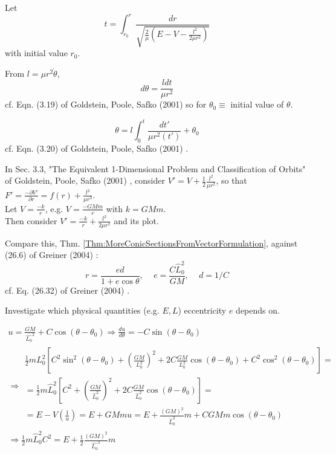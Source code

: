 \documentclass[10pt]{amsart}
\begin{document}
\begin{multicols*}{2}
Let
\[
t =\int_{r_0}^r \frac{dr}{ \sqrt{ \frac{2}{\mu} \left( E - V - \frac{l^2}{2 \mu r^2 } \right) } }
\]
with initial value $r_0$.

From $l= \mu r^2 \dot{\theta}$,
\begin{equation}
d\theta = \frac{l dt}{\mu r^2} 
\end{equation}
cf. Eqn. (3.19) of Goldstein, Poole, Safko (2001) \cite{GPS2001} so for $\theta_0 \equiv $ initial value of $\theta$.

\begin{equation}
\theta = l \int_0^t \frac{dt'}{ \mu r^2(t') } + \theta_0
\end{equation}
cf. Eqn. (3.20) of Goldstein, Poole, Safko (2001) \cite{GPS2001}.

In Sec. 3.3, "The Equivalent 1-Dimensional Problem and Classification of Orbits" of  Goldstein, Poole, Safko (2001) \cite{GPS2001}, consider $V ' = V + \frac{1}{2} \frac{l^2}{\mu r^2}$, so that $F' = \frac{-\partial V'}{\partial r} = f(r) + \frac{l^2}{\mu r^3}$. \\

Let $V = \frac{-k}{r}$, e.g. $V = \frac{-GMm}{r} $ with $k = GMm$. \\

Then consider $V' = \frac{-k}{r} + \frac{l^2}{2\mu r^2}$ and its plot.


Compare this, Thm. \ref{Thm:MoreConicSectionsFromVectorFormulation}, against (26.6) of Greiner (2004) \cite{Grei2004}:
\begin{equation}\label{Eq:ConicSectionPolarCoordinatesFocusCenter}
r = \frac{ed}{ 1 + e\cos{\theta}}, \quad \, e = \frac{C\widehat{L}_0^2}{GM}, \quad \, d = 1/C
\end{equation} cf. Eq. (26.32) of Greiner (2004) \cite{Grei2004}. 

Investigate which physical quantities (e.g. $E, L$) eccentricity $e$ depends on.

\[
\begin{gathered}
u = \frac{GM}{ \widehat{L_0}^2 } + C \cos{(\theta - \theta_0)} \Longrightarrow \frac{du}{d\theta} = -C \sin{(\theta - \theta_0)} \\
\Longrightarrow \begin{gathered}
\frac{1}{2} m L_0^2 \left[ C^2 \sin^2{ (\theta - \theta_0)} + \left( \frac{GM}{L_0^2} \right)^2 + 2 C \frac{GM}{L_0^2} \cos{(\theta - \theta_0)} + C^2 \cos^2{(\theta - \theta_0)} \right] = \\
= \frac{1}{2} m \widehat{L}_0^2 \left[ C^2 + \left( \frac{GM}{\widehat{L}_0^2 } \right)^2 + 2 C \frac{GM}{ \widehat{L}_0^2 } \cos{(\theta - \theta_0)} \right] = \\
= E - V\left( \frac{1}{u} \right) = E + GMmu = E + \frac{(GM)^2 }{ \widehat{L}_0^2 } m + C GM m \cos{(\theta - \theta_0)}
\end{gathered} \\
\Longrightarrow \frac{1}{2} m \widehat{L}_0^2 C^2 = E + \frac{1}{2} \frac{ (GM)^2 }{ \widehat{L_0}^2 } m 
\end{gathered} 
\]


\end{multicols*}
\end{document}
